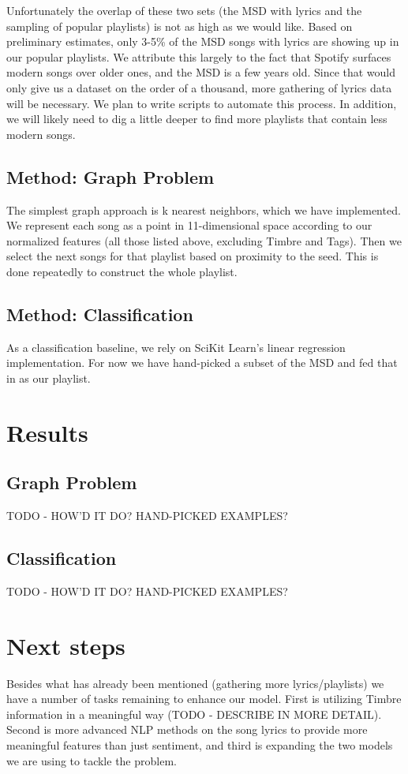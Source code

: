 \documentclass[10pt,journal,compsoc]{IEEEtran}
\begin{document}
Unfortunately the overlap of these two sets (the MSD with lyrics and the sampling of popular playlists) is not as high as we would like. Based on preliminary estimates, only 3-5\% of the MSD songs with lyrics are showing up in our popular playlists. We attribute this largely to the fact that Spotify surfaces modern songs over older ones, and the MSD is a few years old. Since that would only give us a dataset on the order of a thousand, more gathering of lyrics data will be necessary. We plan to write scripts to automate this process. In addition, we will likely need to dig a little deeper to find more playlists that contain less modern songs.

\subsection{Method: Graph Problem}
The simplest graph approach is k nearest neighbors, which we have implemented. We represent each song as a point in 11-dimensional space according to our normalized features (all those listed above, excluding Timbre and Tags). Then we select the next songs for that playlist based on proximity to the seed. This is done repeatedly to construct the whole playlist.

\subsection{Method: Classification}
As a classification baseline, we rely on SciKit Learn's \cite{scikit} linear regression implementation. For now we have hand-picked a subset of the MSD and fed that in as our playlist.

\section{Results}

\subsection{Graph Problem}
TODO - HOW'D IT DO? HAND-PICKED EXAMPLES?

\subsection{Classification}
TODO - HOW'D IT DO? HAND-PICKED EXAMPLES?

\section{Next steps}
Besides what has already been mentioned (gathering more lyrics/playlists) we have a number of tasks remaining to enhance our model. First is utilizing Timbre information in a meaningful way (TODO - DESCRIBE IN MORE DETAIL). Second is more advanced NLP methods on the song lyrics to provide more meaningful features than just sentiment, and third is expanding the two models we are using to tackle the problem.
\end{document}
